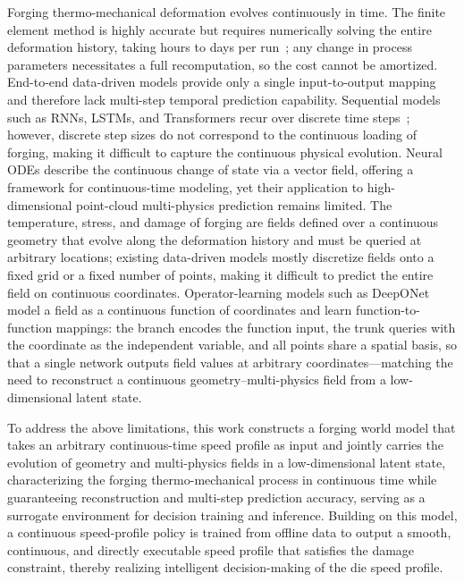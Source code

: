 Forging thermo-mechanical deformation evolves continuously in time. The finite element method is highly accurate but requires numerically solving the entire deformation history, taking hours to days per run~\cite{halici2014modelling}; any change in process parameters necessitates a full recomputation, so the cost cannot be amortized. End-to-end data-driven models provide only a single input-to-output mapping and therefore lack multi-step temporal prediction capability. Sequential models such as RNNs, LSTMs, and Transformers recur over discrete time steps~\cite{elman1990finding, hochreiter1997long, vaswani2017attention}; however, discrete step sizes do not correspond to the continuous loading of forging, making it difficult to capture the continuous physical evolution. Neural ODEs describe the continuous change of state via a vector field, offering a framework for continuous-time modeling, yet their application to high-dimensional point-cloud multi-physics prediction remains limited. The temperature, stress, and damage of forging are fields defined over a continuous geometry that evolve along the deformation history and must be queried at arbitrary locations; existing data-driven models mostly discretize fields onto a fixed grid or a fixed number of points, making it difficult to predict the entire field on continuous coordinates. Operator-learning models such as DeepONet model a field as a continuous function of coordinates and learn function-to-function mappings: the branch encodes the function input, the trunk queries with the coordinate as the independent variable, and all points share a spatial basis, so that a single network outputs field values at arbitrary coordinates---matching the need to reconstruct a continuous geometry--multi-physics field from a low-dimensional latent state.

To address the above limitations, this work constructs a forging world model that takes an arbitrary continuous-time speed profile as input and jointly carries the evolution of geometry and multi-physics fields in a low-dimensional latent state, characterizing the forging thermo-mechanical process in continuous time while guaranteeing reconstruction and multi-step prediction accuracy, serving as a surrogate environment for decision training and inference. Building on this model, a continuous speed-profile policy is trained from offline data to output a smooth, continuous, and directly executable speed profile that satisfies the damage constraint, thereby realizing intelligent decision-making of the die speed profile.

